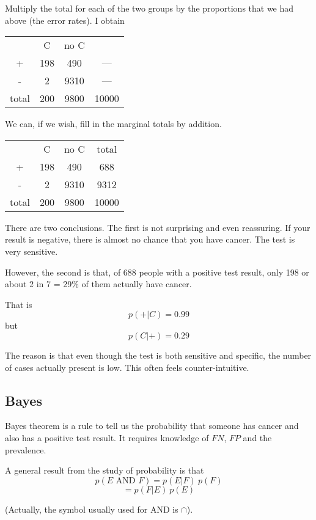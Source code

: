 \documentclass[11pt, oneside]{article}
\begin{document}
Multiply the total for each of the two groups by the proportions that we had above (the error rates).  I obtain
\begin{center}
\begin{tabular}{ |c|c|c|c| } 
 \hline
   & C & no C &  \\ 
 + & 198 & 490 & --- \\ 
 - & 2 & 9310 & --- \\ 
 total & 200 & 9800 & 10000 \\ 
 \hline
\end{tabular}
\end{center}

We can, if we wish, fill in the marginal totals by addition.
\begin{center}
\begin{tabular}{ |c|c|c|c| } 
 \hline
   & C & no C &  total \\ 
 + & 198 & 490 & 688 \\ 
 - & 2 & 9310 & 9312 \\ 
 total & 200 & 9800 & 10000 \\ 
 \hline
\end{tabular}
\end{center}

There are two conclusions.  The first is not surprising and even reassuring.  If your result is negative, there is almost no chance that you have cancer.  The test is very sensitive.

However, the second is that, of 688 people with a positive test result, only 198 or about 2 in 7 = 29\% of them actually have cancer.

That is
\[ p(+ | C) = 0.99 \]
but
\[ p(C | +) = 0.29 \]

The reason is that even though the test is both sensitive and specific, the number of cases actually present is low.  This often feels counter-intuitive.

\subsection*{Bayes}

Bayes theorem is a rule to tell us the probability that someone has cancer and also has a positive test result.  It requires knowledge of $FN$, $FP$ and the prevalence.

A general result from the study of probability is that
\[ p(E \text{ AND } F) = p(E|F) \ p(F) \]
\[ = p(F|E) \ p(E) \]

(Actually, the symbol usually used for AND is $\cap$).
\end{document}
